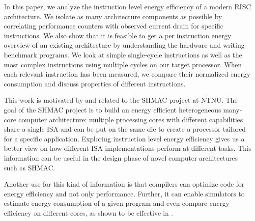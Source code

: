 In this paper, we analyze the instruction level energy efficiency of a modern
RISC architecture. We isolate as many architecture components as possible
by correlating performance counters with observed current drain for specific
instructions. We also show that it is feasible to get a per instruction energy
overview of an existing architecture by understanding the hardware and writing
benchmark programs. We look at simple single-cycle instructions as well as the
most complex instructions using multiple cycles on our target processor. When
each relevant instruction has been measured, we compare their normalized energy
consumption and discuss properties of different instructions.

This work is motivated by and related to the SHMAC
project\cite{ntnushmac,Umuroglu662354,rusten2012implementing} at NTNU. The goal
of the SHMAC project is to build an energy efficient heterogeneous many-core
computer architecture: multiple processing cores with different capabilities
share a single ISA and can be put on the same die to create a processor tailored
for a specific application. Exploring instruction level energy efficiency gives
us a better view on how different ISA implementations perform at different
tasks\cite{kumar2003single}. This information can be useful in the design phase
of novel computer architectures such as SHMAC.

Another use for this kind of information is that compilers can optimize code for
energy efficiency and not only performance. Further, it can enable simulators to
estimate energy consumption of a given program and even compare energy
efficiency on different cores, as shown to be effective in \cite{kumar2003single}.

\vfill
